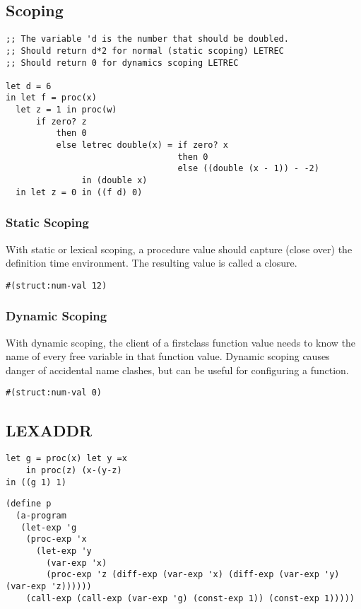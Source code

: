 \documentclass[../main.tex]{subfiles}
\begin{document}
\subsection{Scoping}

\begin{lstlisting}
;; The variable 'd is the number that should be doubled.
;; Should return d*2 for normal (static scoping) LETREC
;; Should return 0 for dynamics scoping LETREC

let d = 6
in let f = proc(x)
  let z = 1 in proc(w)
      if zero? z
          then 0
          else letrec double(x) = if zero? x
                                  then 0
                                  else ((double (x - 1)) - -2)
               in (double x)
  in let z = 0 in ((f d) 0)
\end{lstlisting}

\subsubsection{Static Scoping}
With static or lexical scoping, a procedure value should capture (close over) the definition time environment. The
resulting value is called a closure.

\begin{lstlisting}
#(struct:num-val 12)
\end{lstlisting}

\subsubsection{Dynamic Scoping}
With dynamic scoping, the client of a firstclass function value needs to know the name of every free variable in that
function value. Dynamic scoping causes danger of accidental name clashes, but can be useful for configuring a function.

\begin{lstlisting}
#(struct:num-val 0)
\end{lstlisting}

\subsection{LEXADDR}

\begin{lstlisting}
let g = proc(x) let y =x
    in proc(z) (x-(y-z)
in ((g 1) 1)
\end{lstlisting}

\begin{lstlisting}
(define p
  (a-program
   (let-exp 'g
    (proc-exp 'x
      (let-exp 'y
        (var-exp 'x)
        (proc-exp 'z (diff-exp (var-exp 'x) (diff-exp (var-exp 'y) (var-exp 'z))))))
    (call-exp (call-exp (var-exp 'g) (const-exp 1)) (const-exp 1)))))
\end{lstlisting}
\end{document}

